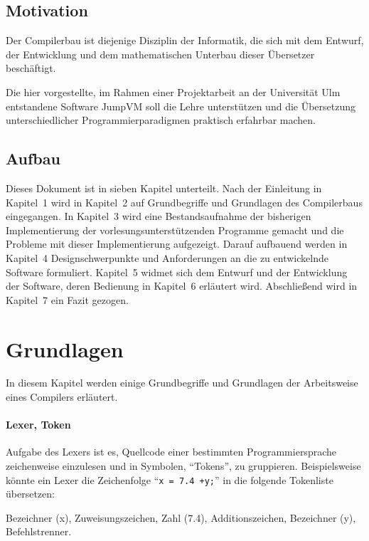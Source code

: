 \documentclass[german, a4paper, parskip, bibliography=totoc]{scrartcl}
\begin{document}
\subsection{Motivation}
Der Compilerbau ist diejenige Disziplin der Informatik, die sich mit dem
Entwurf, der Entwicklung und dem mathematischen Unterbau dieser Übersetzer
beschäftigt.

Die hier vorgestellte, im Rahmen einer Projektarbeit an der Universität Ulm
entstandene Software JumpVM soll die Lehre unterstützen und die Übersetzung
unterschiedlicher Programmierparadigmen praktisch erfahrbar machen.


\subsection{Aufbau}
Dieses Dokument ist in sieben Kapitel unterteilt. Nach der Einleitung in
Kapitel~1 wird in Kapitel~2 auf Grundbegriffe und Grundlagen des Compilerbaus
eingegangen. In Kapitel~3 wird eine Bestandsaufnahme der bisherigen
Implementierung der vorlesungsunterstützenden Programme gemacht und die
Probleme mit dieser Implementierung aufgezeigt. Darauf aufbauend werden in
Kapitel~4 Designschwerpunkte und Anforderungen an die zu entwickelnde Software
formuliert. Kapitel~5 widmet sich dem Entwurf und der Entwicklung der Software,
deren Bedienung in Kapitel~6 erläutert wird. Abschließend wird in Kapitel~7
ein Fazit gezogen.


\section{Grundlagen}
In diesem Kapitel werden einige Grundbegriffe und Grundlagen der Arbeitsweise
eines Compilers erläutert.

\paragraph{Lexer, Token}
Aufgabe des Lexers ist es, Quellcode einer bestimmten Programmiersprache
zeichenweise einzulesen und in Symbolen, \enquote{Tokens}, zu gruppieren.
Beispielsweise könnte ein Lexer die Zeichenfolge
\enquote{\texttt{x = 7.4 +y;}} in die folgende Tokenliste übersetzen:

\begin{addmargin}[2em]{2em}
    \ttfamily Bezeichner (x), Zuweisungszeichen, Zahl (7.4),
    Ad\-di\-ti\-ons\-zei\-chen, Bezeichner (y), Befehlstrenner.
\end{addmargin}
\end{document}
